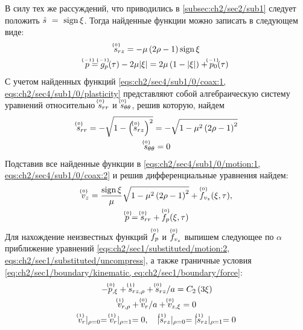 В силу тех же рассуждений, что приводились в \ref{subsec:ch2/sec2/sub1} следует положить $\hat{s}~=~\sign\xi$. Тогда найденные функции можно записать в следующем виде:
\begin{gather}
  \label{sol:ch2/sec4/sub1/srz/0}
  \uindex{s}{0}_{rz} = -\mu \left(2\rho - 1\right) \sign \xi
  \\
  \label{sol:ch2/sec4/sub1/p/-1}
  \uindex{p}{-1} = \uindex{g}{-1}_{p}(\tau) -2\mu\lvert\xi\rvert = 2\mu\left(1-\lvert\xi\rvert\right) + \uindex{p}{-1}_{0}(\tau)
\end{gather}
С учетом найденных функций \cref{eqs:ch2/sec4/sub1/0/coax:1, eqs:ch2/sec4/sub1/0/plasticity} представляют собой алгебраическую систему уравнений относительно $\uindex{s}{0}_{rr}$ и $\uindex{s}{0}_{\theta\theta}$, решив которую, найдем
\begin{gather}
  \label{sol:ch2/sec4/sub1/srr/0}
  \uindex{s}{0}_{rr} = -\sqrt{1-\left(\uindex{s}{0}_{rz}\right)^2} = -\sqrt{1-\mu^2\left(2\rho-1\right)^2}
  \\
  \label{sol:ch2/sec4/sub1/stt/0}
  \uindex{s}{0}_{\theta\theta} = 0
\end{gather}
Подставив все найденные функции в \cref{eqs:ch2/sec4/sub1/0/motion:1, eqs:ch2/sec4/sub1/0/coax:2} и решив дифференциальные уравнения найдем:
\begin{gather}
  \label{sol:ch2/sec4/sub1/vz/0}
  \uindex{v}{0}_{z} = \frac{\sign\xi}{\mu}\sqrt{1-\mu^2\left(2\rho-1\right)^2} + \uindex{f}{0}_{v_{z}}(\xi,\tau),
  \\
  \label{sol:ch2/sec4/sub1/p/0}
  \uindex{p}{0} = \uindex{s}{0}_{rr} +\uindex{f}{0}_{p}(\xi,\tau)
\end{gather}
Для нахождение неизвестных функций $\uindex{f}{0}_{p}$ и $\uindex{f}{0}_{v_{z}}$ выпишем следующее по $\alpha$ приближение уравнений \cref{eqs:ch2/sec1/substituted/motion:2, eqs:ch2/sec1/substituted/uncompress}, а также граничные условия \cref{eq:ch2/sec1/boundary/kinematic, eq:ch2/sec1/boundary/force}:
\begin{gather}
  \label{eqs:ch2/sec4/sub1/1/motion:1}
  -\uindex{p}{0}_{,\xi} + \uindex{s}{1}_{rz,\rho} + \uindex{s}{0}_{rz} / a = C_2 \left(3\xi\right)
  \\
  \label{eqs:ch2/sec4/sub1/1/uncompress}
  \uindex{v}{1}_{r,\rho} + \uindex{v}{0}_{r} / a + \uindex{v}{0}_{z,\xi} = 0
  \\
  \label{eq:ch2/sec4/sub1/boundary/1}
  \uindex{v}{1}_{r}\lvert_{\rho=0} = \uindex{v}{1}_{r}\lvert_{\rho=1} = 0, \quad \lvert \uindex{s}{1}_{rz}\lvert_{\rho=0} = \lvert \uindex{s}{1}_{rz}\lvert_{\rho=1} = 0
\end{gather}
